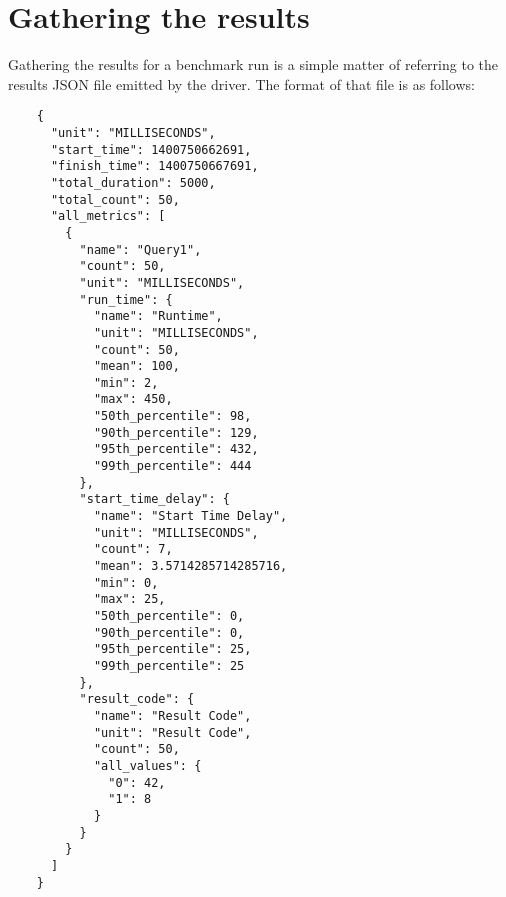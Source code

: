 \section{ Gathering the results }

Gathering the results for a benchmark run is a simple matter of referring to the results JSON file emitted by the driver.
The format of that file is as follows:

{\footnotesize
	\begin{verbatim}
	{
	  "unit": "MILLISECONDS",
	  "start_time": 1400750662691,
	  "finish_time": 1400750667691,
	  "total_duration": 5000,
	  "total_count": 50,
	  "all_metrics": [
	    {
	      "name": "Query1",
	      "count": 50,
	      "unit": "MILLISECONDS",
	      "run_time": {
	        "name": "Runtime",
	        "unit": "MILLISECONDS",
	        "count": 50,
	        "mean": 100,
	        "min": 2,
	        "max": 450,
	        "50th_percentile": 98,
	        "90th_percentile": 129,
	        "95th_percentile": 432,
	        "99th_percentile": 444
	      },
	      "start_time_delay": {
	        "name": "Start Time Delay",
	        "unit": "MILLISECONDS",
	        "count": 7,
	        "mean": 3.5714285714285716,
	        "min": 0,
	        "max": 25,
	        "50th_percentile": 0,
	        "90th_percentile": 0,
	        "95th_percentile": 25,
	        "99th_percentile": 25
	      },
	      "result_code": {
	        "name": "Result Code",
	        "unit": "Result Code",
	        "count": 50,
	        "all_values": {
	          "0": 42,
	          "1": 8
	        }
	      }
	    }
	  ]
	}
	\end{verbatim}
}